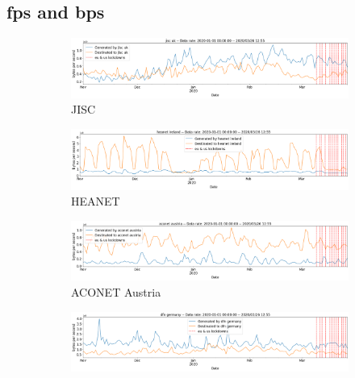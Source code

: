 \documentclass[10pt, journal, letterpaper]{IEEEtran}
\newcommand\linearFigSze{0.48}
\begin{document}
\subsection{fps and bps}
\begin{figure}
    \begin{subfigure}{\linearFigSze\textwidth}
          \centering
          \includegraphics[width=\columnwidth]{img/jisc_bps.png}
          \caption{JISC}
          \label{fig:jisc_bps}
    \end{subfigure}
    \begin{subfigure}{\linearFigSze\textwidth}
          \centering
          \includegraphics[width=\columnwidth]{img/heanet_bps.png}
          \caption{HEANET}
          \label{fig:HEANET_bps}
    \end{subfigure}
    \begin{subfigure}{\linearFigSze\textwidth}
          \centering
          \includegraphics[width=\columnwidth]{img/aconet_bps.png}
          \caption{ACONET Austria}
          \label{fig:aconet_bps}
    \end{subfigure}
    \begin{subfigure}{\linearFigSze\textwidth}
          \centering
          \includegraphics[width=\columnwidth]{img/dfn_bps.png}

\end{subfigure}
\end{figure}
\end{document}
